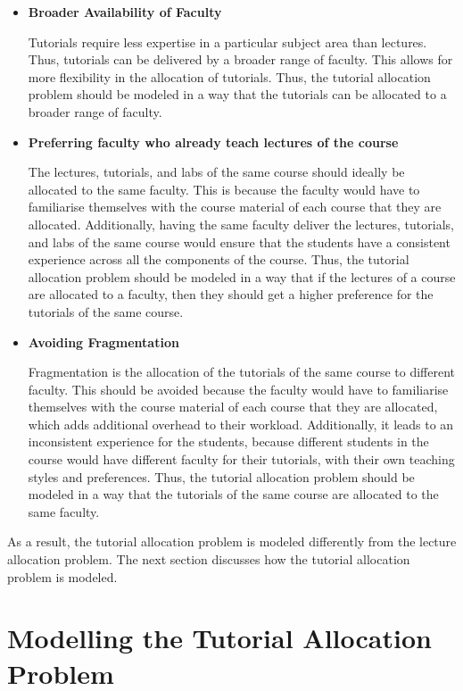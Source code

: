 \begin{itemize}
  \item \textbf{Broader Availability of Faculty}

        Tutorials require less expertise in a particular subject area than lectures. Thus, tutorials can be delivered by a broader range of faculty. This allows for more flexibility in the allocation of tutorials. Thus, the tutorial allocation problem should be modeled in a way that the tutorials can be allocated to a broader range of faculty.

  \item \textbf{Preferring faculty who already teach lectures of the course}

        The lectures, tutorials, and labs of the same course should ideally be allocated to the same faculty. This is because the faculty would have to familiarise themselves with the course material of each course that they are allocated. Additionally, having the same faculty deliver the lectures, tutorials, and labs of the same course would ensure that the students have a consistent experience across all the components of the course. Thus, the tutorial allocation problem should be modeled in a way that if the lectures of a course are allocated to a faculty, then they should get a higher preference for the tutorials of the same course.

  \item \textbf{Avoiding Fragmentation}

        Fragmentation is the allocation of the tutorials of the same course to different faculty. This should be avoided because the faculty would have to familiarise themselves with the course material of each course that they are allocated, which adds additional overhead to their workload. Additionally, it leads to an inconsistent experience for the students, because different students in the course would have different faculty for their tutorials, with their own teaching styles and preferences. Thus, the tutorial allocation problem should be modeled in a way that the tutorials of the same course are allocated to the same faculty.

\end{itemize}

As a result, the tutorial allocation problem is modeled differently from the lecture allocation problem. The next section discusses how the tutorial allocation problem is modeled.

\section{Modelling the Tutorial Allocation Problem}

